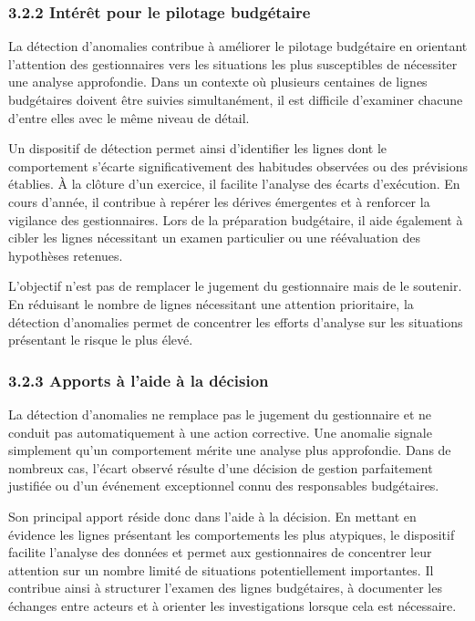 \subsubsection*{3.2.2 \quad Int\'er\^et pour le pilotage budg\'etaire}

La d\'etection d'anomalies contribue \`a am\'eliorer le pilotage budg\'etaire en
orientant l'attention des gestionnaires vers les situations les plus
susceptibles de n\'ecessiter une analyse approfondie. Dans un contexte o\`u
plusieurs centaines de lignes budg\'etaires doivent \^etre suivies
simultan\'ement, il est difficile d'examiner chacune d'entre elles avec le
m\^eme niveau de d\'etail.

Un dispositif de d\'etection permet ainsi d'identifier les lignes dont le
comportement s'\'ecarte significativement des habitudes observ\'ees ou des
pr\'evisions \'etablies. \`A la cl\^oture d'un exercice, il facilite l'analyse
des \'ecarts d'ex\'ecution. En cours d'ann\'ee, il contribue \`a rep\'erer les
d\'erives \'emergentes et \`a renforcer la vigilance des gestionnaires. Lors
de la pr\'eparation budg\'etaire, il aide \'egalement \`a cibler les lignes
n\'ecessitant un examen particulier ou une r\'e\'evaluation des hypoth\`eses
retenues.

L'objectif n'est pas de remplacer le jugement du gestionnaire mais de le
soutenir. En r\'eduisant le nombre de lignes n\'ecessitant une attention
prioritaire, la d\'etection d'anomalies permet de concentrer les efforts
d'analyse sur les situations pr\'esentant le risque le plus \'elev\'e.

\subsubsection*{3.2.3 \quad Apports \`a l'aide \`a la d\'ecision}

La d\'etection d'anomalies ne remplace pas le jugement du gestionnaire et ne
conduit pas automatiquement \`a une action corrective. Une anomalie signale
simplement qu'un comportement m\'erite une analyse plus approfondie. Dans de
nombreux cas, l'\'ecart observ\'e r\'esulte d'une d\'ecision de gestion
parfaitement justifi\'ee ou d'un \'ev\'enement exceptionnel connu des
responsables budg\'etaires.

Son principal apport r\'eside donc dans l'aide \`a la d\'ecision. En mettant
en \'evidence les lignes pr\'esentant les comportements les plus atypiques, le
dispositif facilite l'analyse des donn\'ees et permet aux gestionnaires de
concentrer leur attention sur un nombre limit\'e de situations potentiellement
importantes. Il contribue ainsi \`a structurer l'examen des lignes
budg\'etaires, \`a documenter les \'echanges entre acteurs et \`a orienter les
investigations lorsque cela est n\'ecessaire.

